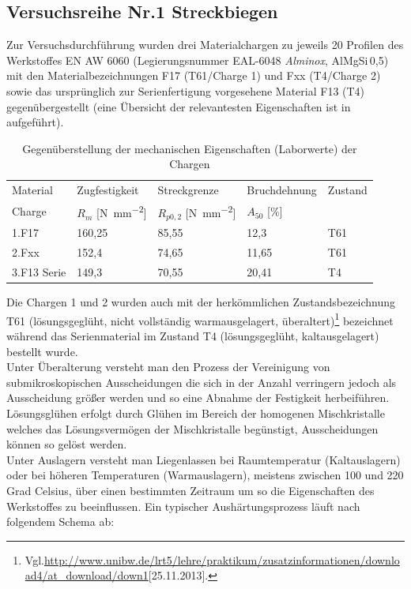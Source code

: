\documentclass[12pt,a4paper,parskip,twoside,BCOR5mm,headsepline]{scrartcl}
\begin{document}
\subsection{Versuchsreihe Nr.1 Streckbiegen}
\label{sec:versuchsreihe1}
Zur Versuchsdurchführung wurden drei Materialchargen zu jeweils 20 Profilen des Werkstoffes EN AW 6060 (Legierungsnummer EAL-6048 \emph{Alminox}, AlMgSi\,0,5) mit den Materialbezeichnungen F17 (T61/Charge 1) und Fxx (T4/Charge 2) sowie das ursprünglich zur Serienfertigung vorgesehene Material F13 (T4)  gegenübergestellt (eine Übersicht der relevantesten Eigenschaften ist in  aufgeführt).
\begin{table}[hbtp]
\caption{Gegenüberstellung der mechanischen Eigenschaften (Laborwerte) der Chargen}
\label{tab:chargeneigenschaften}
\centering
\begin{tabular}{lllll}
\toprule
Material & Zugfestigkeit & Streckgrenze & Bruchdehnung & Zustand \\
Charge &  $R_m $ [\si{\newton\per\milli\meter\squared}] &  $R_{p0,2}$ [\si{\newton\per\milli\meter\squared}] &  $A_{50}$ [\%] & \\
\midrule
1.F17 & 160,25 & 85,55 &  12,3  & T61 \\
2.Fxx & 152,4 & 74,65 &   11,65  & T61 \\
3.F13 Serie & 149,3 & 70,55 & 20,41  & T4 \\
\bottomrule




\end{tabular}
\end{table}



 Die Chargen 1 und 2 wurden auch mit der herkömmlichen Zustandsbezeichnung T61 (lösungsgeglüht, nicht vollständig warmausgelagert, überaltert)\footnote{Vgl.\url{http://www.unibw.de/lrt5/lehre/praktikum/zusatzinformationen/download4/at_download/down1}[25.11.2013].} bezeichnet während das Serienmaterial im Zustand T4 (lösungsgeglüht, kaltausgelagert) bestellt wurde. \\
 Unter Überalterung versteht man  den Prozess der Vereinigung von  submikroskopischen Ausscheidungen die sich  in der Anzahl verringern jedoch als Ausscheidung größer werden und so eine Abnahme der Festigkeit herbeiführen. \autocite[52]{wki}\\
  Lösungsglühen erfolgt durch Glühen im Bereich der homogenen Mischkristalle welches das   Lösungsvermögen der Mischkristalle begünstigt, Ausscheidungen können so gelöst werden.\\
   Unter Auslagern versteht man Liegenlassen bei Raumtemperatur (Kaltauslagern) oder bei  höheren Temperaturen (Warmauslagern), meistens zwischen 100 und 220 Grad Celsius, über einen bestimmten Zeitraum um so die Eigenschaften des Werkstoffes zu beeinflussen. \autocite[213]{wk}
Ein typischer Aushärtungsprozess läuft nach folgendem Schema ab:
\end{document}
